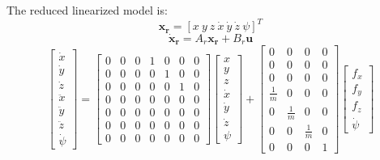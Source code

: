 \documentclass[a4paper, 12pt]{report}
\begin{document}
The reduced linearized model is:
 \[\boldsymbol{x_r} =  [x \ y \ z \ \dot x \ \dot y \ \dot z \ \psi]^T \]
\[\boldsymbol{\dot x_r} =  A_r \boldsymbol{x_r} + B_r \boldsymbol{u} \]
\[\begin{bmatrix}\dot x \\ \dot y \\ \dot z \\ \ddot x \\ \ddot y \\ \ddot z \\ \dot \psi\end{bmatrix}  = 
\begin{bmatrix}  0 & 0 & 0 & 1 & 0 & 0 & 0 \\ 0 & 0 & 0 & 0 & 1 & 0 & 0 \\ 0 & 0 & 0 & 0 & 0 & 1 & 0 \\ 0 & 0 & 0 & 0 & 0 & 0 & 0 \\ 0 & 0 & 0 & 0 & 0 & 0 & 0 \\ 0 & 0 & 0 & 0 & 0 & 0 & 0 \\ 0 & 0 & 0 & 0 & 0 & 0 & 0 \end{bmatrix} 
\begin{bmatrix} x \\ y \\ z \\ \dot x \\ \dot y \\ \dot z \\ \psi \end{bmatrix}  + \begin{bmatrix}  0 & 0 & 0 & 0 \\ 0 & 0 & 0 & 0 \\ 0 & 0 & 0 & 0 \\ \frac{1}{m} & 0 & 0 & 0 \\ 0 & \frac{1}{m} & 0 & 0 \\ 0 & 0 & \frac{1}{m} & 0 \\ 0 & 0 & 0 & 1 \end{bmatrix} \begin{bmatrix} f_x \\ f_y \\ f_z \\ \dot \psi \end{bmatrix} \]
\end{document}
